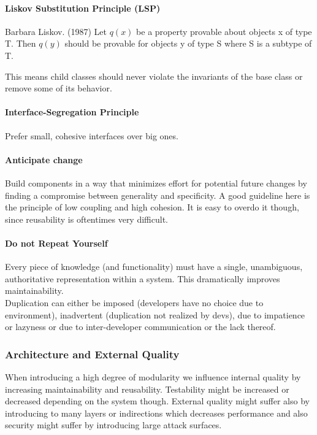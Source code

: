 \paragraph{Liskov Substitution Principle (LSP)}
\begin{chapquote}{Barbara Liskov. (1987)}
    Let $q(x)$ be a property provable about objects x of type T. Then $q(y)$ should
be provable for objects y of type S where S is a subtype of T.
\end{chapquote}
This means child classes should never violate the invariants of the base class or remove some of its behavior.

\paragraph{Interface-Segregation Principle}
Prefer small, cohesive interfaces over big ones.

\paragraph{Anticipate change}
Build components in a way that minimizes effort for potential future changes by finding a compromise between generality and specificity.
A good guideline here is the principle of low coupling and high cohesion.
It is easy to overdo it though, since reusability is oftentimes very difficult.

\paragraph{Do not Repeat Yourself}
Every piece of knowledge (and functionality) must have a single, unambiguous, authoritative representation within a system.
This dramatically improves maintainability.\\
Duplication can either be imposed (developers have no choice due to environment), inadvertent (duplication not realized by devs), due to impatience or lazyness or due to inter-developer communication or the lack thereof.

\subsubsection{Architecture and External Quality}
When introducing a high degree of modularity we influence internal quality by increasing maintainability and reusability.
Testability might be increased or decreased depending on the system though.
External quality might suffer also by introducing to many layers or indirections
which decreases performance and also security might suffer by introducing large attack surfaces.\\

